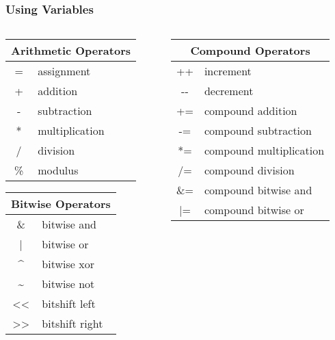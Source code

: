 \begin{frame}
	\frametitle{Using Variables}
	\begin{columns}[c]
		\begin{column}{0.5\textwidth}
			\begin{center}
				\begin{tabular}{c|l}
					\multicolumn{2}{c}{Arithmetic Operators}\\
					\hline
					= & assignment\\
					+ & addition\\
					- & subtraction\\
					* & multiplication\\
					/ & division\\
					\% & modulus\\
				\end{tabular}
				\vfill
				\begin{tabular}{c|l}
					\multicolumn{2}{c}{Bitwise Operators}\\
					\hline
					\& & bitwise and\\
					| & bitwise or\\
					\^{} & bitwise xor\\
					\~{} & bitwise not\\
					<< & bitshift left\\
					>> & bitshift right\\
				\end{tabular}
			\end{center}
		\end{column}
		\begin{column}{0.5\textwidth}
			\begin{center}
				\begin{tabular}{c|l}
					\multicolumn{2}{c}{Compound Operators}\\
					\hline
					++ & increment\\
					-{-} & decrement\\
					+= & compound addition\\
					-= & compound subtraction\\
					*= & compound multiplication\\
					/= & compound division\\
					\&= & compound bitwise and\\
					|= & compound bitwise or\\
				\end{tabular}
			\end{center}
		\end{column}
	\end{columns}
\end{frame}

